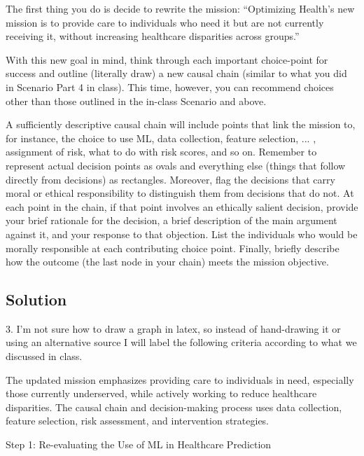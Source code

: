 \documentclass[submit]{harvardml}
\begin{document}
\begin{problem}
The first thing you do is decide to rewrite the mission: “Optimizing Health’s new mission is to provide care to individuals who need it but are not currently receiving it, without increasing healthcare disparities across groups.”

With this new goal in mind, think through each important choice-point for success and outline (literally draw) a new causal chain (similar to what you did in Scenario Part 4 in class). This time, however, you can recommend choices other than those outlined in the in-class Scenario and above. 

A sufficiently descriptive causal chain will include points that link the mission to, for instance, the choice to use ML, data collection, feature selection, ... , assignment of risk, what to do with risk scores, and so on. Remember to represent actual decision points as ovals and everything else (things that follow directly from decisions) as rectangles. Moreover, flag the decisions that carry moral or ethical responsibility to distinguish them from decisions that do not. At each point in the chain, if that point involves an ethically salient decision, provide your brief rationale for the decision, a brief description of the main argument against it, and your response to that objection. List the individuals who would be morally responsible at each contributing choice point. Finally, briefly describe how the outcome (the last node in your chain) meets the mission objective.


\end{problem}

\subsection*{Solution}

\newpage 

3.  I'm not sure how to draw a graph in latex, so instead of hand-drawing it or using an alternative source I will label the following criteria according to what we discussed in class. 

The updated mission emphasizes providing care to individuals in need, especially those currently underserved, while actively working to reduce healthcare disparities. The causal chain and decision-making process uses data collection, feature selection, risk assessment, and intervention strategies. 
\newline

Step 1: Re-evaluating the Use of ML in Healthcare Prediction
\end{document}
